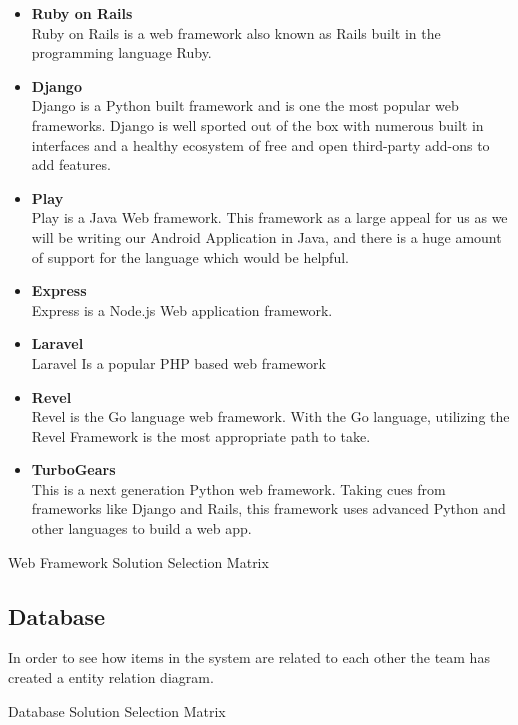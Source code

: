 \documentclass[Letter,11pt]{article}
\begin{document}
		\begin{itemize}
			\item \textbf{Ruby on Rails} \\
			Ruby on Rails is a web framework also known as Rails built in the programming language Ruby. 
			\item \textbf{Django} \\
			Django is a Python built framework and is one the most popular web frameworks. Django is well sported out of the box with numerous built in interfaces and a healthy ecosystem of free and open third-party add-ons to add features.
			\item \textbf{Play} \\
			Play is a Java Web framework. This framework as a large appeal for us as we will be writing our Android Application in Java, and there is a huge amount of support for the language which would be helpful.
			\item  \textbf{Express}\\
			Express is a Node.js Web application framework.
			\item \textbf{Laravel} \\
			Laravel Is a popular PHP based web framework
			\item \textbf{Revel} \\
			Revel is the Go language web framework. With the Go language, utilizing the Revel Framework is the most appropriate path to take. 
			\item \textbf{TurboGears}\\
			This is a next generation Python web framework. Taking cues from frameworks like Django and Rails, this framework uses advanced Python and other languages to build a web app.
		\end{itemize}
		
		
	
		\begin{table}[h]
			\centering
			
			\caption{\label{WebMatrix} Web Framework Solution Selection Matrix}
		\end{table}
	
	
	\subsection{Database}
		In order to see how items in the system are related to each other the team has created a entity relation diagram.
		\begin{table}[h]
			\centering
			
			\caption{\label{DBMatrix} Database Solution Selection Matrix}
		\end{table}
		
\end{document}
